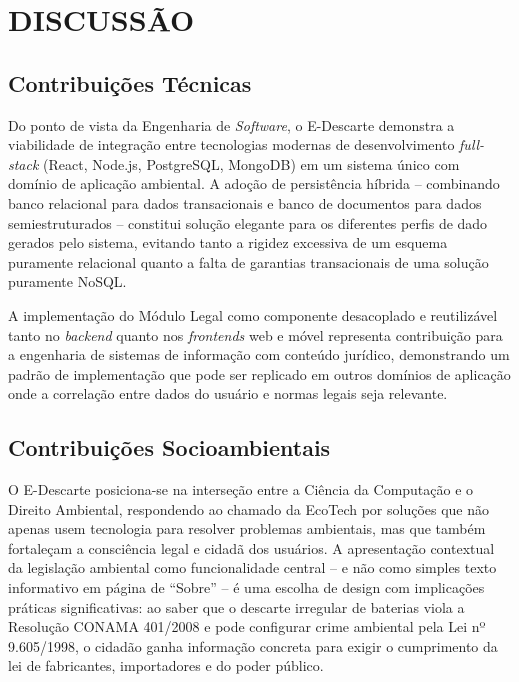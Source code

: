 \documentclass[12pt, a4paper]{article}
\numberwithin{equation}{section}
\numberwithin{figure}{section}
\numberwithin{table}{section}
\begin{document}
\section{DISCUSSÃO}

\subsection{Contribuições Técnicas}

Do ponto de vista da Engenharia de \textit{Software}, o E-Descarte demonstra
a viabilidade de integração entre tecnologias modernas de desenvolvimento
\textit{full-stack} (React, Node.js, PostgreSQL, MongoDB) em um sistema único
com domínio de aplicação ambiental. A adoção de persistência híbrida --
combinando banco relacional para dados transacionais e banco de documentos para
dados semiestruturados -- constitui solução elegante para os diferentes perfis
de dado gerados pelo sistema, evitando tanto a rigidez excessiva de um esquema
puramente relacional quanto a falta de garantias transacionais de uma solução
puramente NoSQL.

A implementação do Módulo Legal como componente desacoplado e reutilizável
tanto no \textit{backend} quanto nos \textit{frontends} web e móvel representa
contribuição para a engenharia de sistemas de informação com conteúdo jurídico,
demonstrando um padrão de implementação que pode ser replicado em outros
domínios de aplicação onde a correlação entre dados do usuário e normas legais
seja relevante.

\subsection{Contribuições Socioambientais}

O E-Descarte posiciona-se na interseção entre a Ciência da Computação e o
Direito Ambiental, respondendo ao chamado da EcoTech por soluções que não
apenas usem tecnologia para resolver problemas ambientais, mas que também
fortaleçam a consciência legal e cidadã dos usuários. A apresentação contextual
da legislação ambiental como funcionalidade central -- e não como simples texto
informativo em página de ``Sobre'' -- é uma escolha de design com implicações
práticas significativas: ao saber que o descarte irregular de baterias viola a
Resolução CONAMA 401/2008 e pode configurar crime ambiental pela Lei nº
9.605/1998, o cidadão ganha informação concreta para exigir o cumprimento da
lei de fabricantes, importadores e do poder público.
\end{document}
